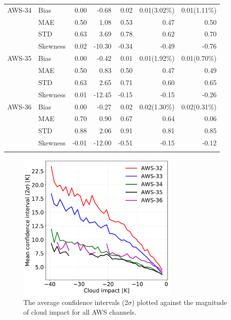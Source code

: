 \documentclass[amt, manuscript]{copernicus}
\begin{document}
\begin{table}[t]
\begin{tabular}{llrr|rrr}
		\middlehline
AWS-34	  &Bias    &    0.00 &         -0.68 &            0.02 &                0.01(3.02\%)& 0.01(1.11\%) \\
		  &MAE      &    0.50 &          1.08 &            0.53 &                 0.47 		 & 0.50\\
		  &STD      &    0.63 &          3.69 &            0.78 &                 0.62 		 & 0.70\\
		  &Skewness &    0.02 &        -10.30 &           -0.34 &                -0.49 		 &-0.76	\\
		 \middlehline
AWS-35	 & Bias     &    0.00 &         -0.42 &            0.01 &                 0.01(1.92\%) & 0.01(0.70\%) \\
		 &MAE       &    0.50 &          0.83 &            0.50 &                 0.47 		   & 0.49\\
		 &STD       &    0.63 &          2.65 &            0.71 &                 0.60         & 0.65\\
		 &Skewness  &    0.01 &        -12.45 &           -0.15 &                -0.15         &-0.26\\
		 \middlehline
AWS-36   &Bias     &    0.00 &         -0.27 &            0.02 &                 0.02(1.30\%) & 0.02(0.31\%)\\
		 &MAE      &    0.70 &          0.90 &            0.67 &                 0.64 		  & 0.06\\
		 &STD      &    0.88 &          2.06 &            0.91 &                 0.81 		  &0.85\\
		 &Skewness &   -0.01 &        -12.00 &           -0.51 &                -0.15 		  &-0.12\\	 
		\bottomhline				
	\end{tabular}
	\belowtable{} %
\end{table}
\begin{figure}[t]
	\includegraphics[width = 80mm]{Figures/cloud_impact_uncertainty_AWS.pdf}	
	\caption{The average confidence intervals (2$\sigma$) plotted against the magnitude of cloud impact for all AWS channels.}
	\label{fig:uncertainty_cloud_impact}	
\end{figure}
\end{document}
